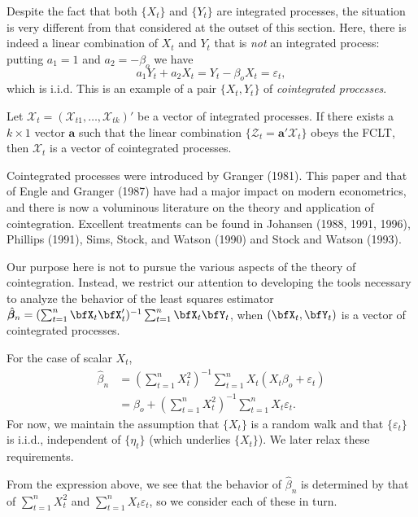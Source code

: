 Despite the fact that both $\{X_t\}$ and $\{Y_t\}$ are integrated processes, the situation is very different from that considered at the outset of this section. Here, there is indeed a linear combination of $X_t$ and $Y_t$ that is \emph{not} an integrated process: putting $a_1 = 1$ and $a_2 = -\beta_o$ we have
\[
a_1 Y_t + a_2 X_t = Y_t - \beta_o X_t = \varepsilon_t,
\]
which is i.i.d. This is an example of a pair $\{X_t, Y_t\}$ of \emph{cointegrated processes}.

\begin{definition}\label{def:cointegration}
Let $\boldsymbol{\mathcal{X}}_t = (\mathcal{X}_{t1}, \ldots, \mathcal{X}_{tk})'$ be a vector of integrated processes. If there exists a $k \times 1$ vector $\mathbf{a}$ such that the linear combination $\{\mathcal{Z}_t = \mathbf{a}'\boldsymbol{\mathcal{X}}_t\}$ obeys the FCLT, then $\boldsymbol{\mathcal{X}}_t$ is a vector of cointegrated processes.
\end{definition}

Cointegrated processes were introduced by Granger (1981). This paper and that of Engle and Granger (1987) have had a major impact on modern econometrics, and there is now a voluminous literature on the theory and application of cointegration. Excellent treatments can be found in Johansen (1988, 1991, 1996), Phillips (1991), Sims, Stock, and Watson (1990) and Stock and Watson (1993).

Our purpose here is not to pursue the various aspects of the theory of cointegration. Instead, we restrict our attention to developing the tools necessary to analyze the behavior of the least squares estimator $\hat{\boldsymbol{\beta}}_n = (\sum_{t=1}^{n} \bfX_t \bfX_t')^{-1}\sum_{t=1}^{n} \bfX_t \bfY_t$, when $(\bfX_t, \bfY_t)$ is a vector of cointegrated processes.

For the case of scalar $X_t$,
\begin{align*}
\hat{\beta}_n &= \left(\sum_{t=1}^{n} X_t^2\right)^{-1}\sum_{t=1}^{n} X_t(X_t \beta_o + \varepsilon_t) \\
&= \beta_o + \left(\sum_{t=1}^{n} X_t^2\right)^{-1}\sum_{t=1}^{n} X_t \varepsilon_t.
\end{align*}
For now, we maintain the assumption that $\{X_t\}$ is a random walk and that $\{\varepsilon_t\}$ is i.i.d., independent of $\{\eta_t\}$ (which underlies $\{X_t\}$). We later relax these requirements.

From the expression above, we see that the behavior of $\hat{\beta}_n$ is determined by that of $\sum_{t=1}^{n} X_t^2$ and $\sum_{t=1}^{n} X_t \varepsilon_t$, so we consider each of these in turn.

